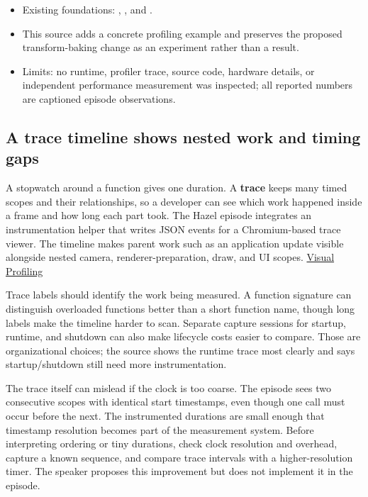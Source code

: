 \hypertarget{06-engine-ii-ch041-source-to-volume-map}{}

\begin{itemize}
\tightlist
\item
  Existing foundations: , , and .
\item
  This source adds a concrete profiling example and preserves the proposed transform-baking change as an experiment rather than a result.
\item
  Limits: no runtime, profiler trace, source code, hardware details, or independent performance measurement was inspected; all reported numbers are captioned episode observations.
\end{itemize}

\subsection{A trace timeline shows nested work and timing gaps}\label{06-engine-ii-ch041-a-trace-timeline-shows-nested-work-and-timing-gaps}

\hypertarget{06-engine-ii-ch041-a-trace-timeline-shows-nested-work-and-timing-gaps}{}

A stopwatch around a function gives one duration. A \textbf{trace} keeps many timed scopes and their relationships, so a developer can see which work happened inside a frame and how long each part took. The Hazel episode integrates an instrumentation helper that writes JSON events for a Chromium-based trace viewer. The timeline makes parent work such as an application update visible alongside nested camera, renderer-preparation, draw, and UI scopes. \href{https://www.youtube.com/watch?v=qiD39bB7DvA}{Visual Profiling}

Trace labels should identify the work being measured. A function signature can distinguish overloaded functions better than a short function name, though long labels make the timeline harder to scan. Separate capture sessions for startup, runtime, and shutdown can also make lifecycle costs easier to compare. Those are organizational choices; the source shows the runtime trace most clearly and says startup/shutdown still need more instrumentation.

The trace itself can mislead if the clock is too coarse. The episode sees two consecutive scopes with identical start timestamps, even though one call must occur before the next. The instrumented durations are small enough that timestamp resolution becomes part of the measurement system. Before interpreting ordering or tiny durations, check clock resolution and overhead, capture a known sequence, and compare trace intervals with a higher-resolution timer. The speaker proposes this improvement but does not implement it in the episode.

